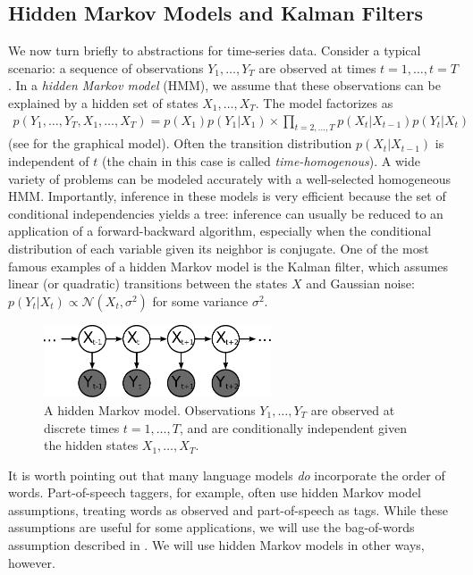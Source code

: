 \subsection{Hidden Markov Models and Kalman Filters}
We now turn briefly to abstractions for time-series data.  Consider a
typical scenario: a sequence of observations $Y_1, \ldots, Y_T$ are
observed at times $t=1, \ldots, t=T$.  In a \emph{hidden Markov model}
(HMM), we assume that these observations can be explained by a hidden set of states $X_1, \ldots, X_T$.  The model factorizes as
\begin{align}
  p(Y_1, \ldots, Y_T, X_1, \ldots, X_T) = p(X_1) p(Y_1 | X_1) \times \prod_{t=2, \ldots, T} p(X_t | X_{t-1}) p(Y_t | X_t)
\end{align}
(see  for the graphical model).  Often the transition
distribution $p(X_t | X_{t-1})$ is independent of $t$ (the chain in
this case is called \emph{time-homogenous}).  A wide variety of
problems can be modeled accurately with a well-selected homogeneous
HMM.  Importantly, inference in these models is very efficient because
the set of conditional independencies yields a tree: inference can
usually be reduced to an application of a forward-backward algorithm,
especially when the conditional distribution of each variable given
its neighbor is conjugate.  One of the most famous examples of a
hidden Markov model is the Kalman filter, which assumes linear (or
quadratic) transitions between the states $X$ and Gaussian noise:
$p(Y_t | X_t) \propto \mathcal{N}(X_t, \sigma^2)$ for some variance
$\sigma^2$.
\begin{figure}
  \begin{center}
  \includegraphics[width=0.6\textwidth]{chapter_introductory_material/figs/hmm_gm.pdf}
  \end{center}
  \caption{A hidden Markov model.  Observations $Y_1, \ldots, Y_T$ are observed at discrete times $t=1, \ldots, T$, and are conditionally independent given the hidden states $X_1, \ldots, X_T$.}
  \label{fig:hmm_gm}
\end{figure}

It is worth pointing out that many language models \emph{do}
incorporate the order of words.  Part-of-speech taggers, for example,
often use hidden Markov model assumptions, treating words as observed
and part-of-speech as tags.  While these assumptions are useful for
some applications, we will use the bag-of-words assumption described
in . We will use hidden Markov models in other ways,
however.

